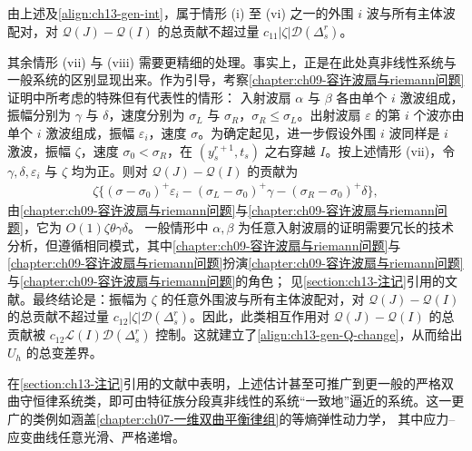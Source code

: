 \documentclass[../../main.tex]{subfiles}
\begin{document}
由上述及\eqref{align:ch13-gen-int}，属于情形 (i) 至 (vi) 之一的外围 $i$ 波与所有主体波配对，对 $\mathscr{Q}(J)-\mathscr{Q}(I)$ 的总贡献不超过量 $c_{11}|\zeta|\mathscr{D}(\Delta_s^r)$。

其余情形 (vii) 与 (viii) 需要更精细的处理。事实上，正是在此处真非线性系统与一般系统的区别显现出来。作为引导，考察\cref{chapter:ch09-容许波扇与riemann问题}证明中所考虑的特殊但有代表性的情形：
入射波扇 $\alpha$ 与 $\beta$ 各由单个 $i$ 激波组成，振幅分别为 $\gamma$ 与 $\delta$，速度分别为 $\sigma_L$ 与 $\sigma_R$，$\sigma_R\leqslant\sigma_L$。出射波扇 $\varepsilon$ 的第 $i$ 个波亦由单个 $i$ 激波组成，振幅 $\varepsilon_i$，速度 $\sigma$。为确定起见，进一步假设外围 $i$ 波同样是 $i$ 激波，振幅 $\zeta$，速度 $\sigma_0<\sigma_R$，在 $(y_s^{r+1},t_s)$ 之右穿越 $I$。按上述情形 (vii)，令 $\gamma,\delta,\varepsilon_i$ 与 $\zeta$ 均为正。则对 $\mathscr{Q}(J)-\mathscr{Q}(I)$ 的贡献为
\begin{align}
\zeta\Big\{(\sigma-\sigma_0)^+\varepsilon_i-(\sigma_L-\sigma_0)^+\gamma-(\sigma_R-\sigma_0)^+\delta\Big\},
\label{align:ch13-gen-edge}
\end{align}
由\cref{chapter:ch09-容许波扇与riemann问题}与\cref{chapter:ch09-容许波扇与riemann问题}，它为 $O(1)\zeta\theta\gamma\delta$。
一般情形中 $\alpha,\beta$ 为任意入射波扇的证明需要冗长的技术分析，但遵循相同模式，其中\cref{chapter:ch09-容许波扇与riemann问题}与\cref{chapter:ch09-容许波扇与riemann问题}扮演\cref{chapter:ch09-容许波扇与riemann问题}与\cref{chapter:ch09-容许波扇与riemann问题}的角色；
见\cref{section:ch13-注记}引用的文献。最终结论是：振幅为 $\zeta$ 的任意外围波与所有主体波配对，对 $\mathscr{Q}(J)-\mathscr{Q}(I)$ 的总贡献不超过量 $c_{12}|\zeta|\mathscr{D}(\Delta_s^r)$。因此，此类相互作用对 $\mathscr{Q}(J)-\mathscr{Q}(I)$ 的总贡献被 $c_{12}\mathscr{L}(I)\mathscr{D}(\Delta_s^r)$ 控制。这就建立了\eqref{align:ch13-gen-Q-change}，从而给出 $U_h$ 的总变差界。

在\cref{section:ch13-注记}引用的文献中表明，上述估计甚至可推广到更一般的严格双曲守恒律系统类，即可由特征族分段真非线性的系统``一致地''逼近的系统。这一更广的类例如涵盖\cref{chapter:ch07-一维双曲平衡律组}的等熵弹性动力学，
其中应力--应变曲线任意光滑、严格递增。
\end{document}
